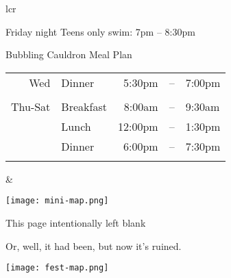 \documentclass[letterpaper,10pt,twoside,openright,final,article,landscape]{memoir}
\begin{document}
\begin{tabular}{lcr}
\begin{minipage}{3in}
Friday night Teens only swim: 7pm -- 8:30pm


Bubbling Cauldron Meal Plan

\begin{center}
  \begin{tabular}{rlrcl}
    \\ \hline
    Wed & Dinner & 5:30pm&--&7:00pm  \\ \\
    Thu-Sat & Breakfast & 8:00am&--&9:30am \\
    & Lunch & 12:00pm&--&1:30pm \\
    & Dinner & 6:00pm&--&7:30pm \\
    \hline \\
  \end{tabular}
\end{center}

\end{minipage} & \begin{minipage}

\texttt{[image: mini-map.png]}

\end{minipage}
\end{tabular}

\pagebreak


This page intentionally left blank

\vfill

Or, well, it had been, but now it's ruined.


\pagebreak

\vfill
\centering\texttt{[image: fest-map.png]}
\vfill
\end{document}
